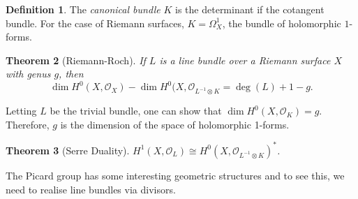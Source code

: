 \documentclass[10pt, a4paper]{article}
\theoremstyle{plain}
\newtheorem{thrm}{Theorem}[section]
\theoremstyle{definition}
\newtheorem{defn}[thrm]{Definition}
\begin{document}
\begin{defn} The \emph{canonical bundle} $K$ is the determinant if the cotangent bundle. For the case of Riemann surfaces, $K = \Omega^1_X$, the bundle of holomorphic $1$-forms. 
\end{defn} 
\begin{thrm}[Riemann-Roch]
If $L$ is a line bundle over a Riemann surface $X$ with genus $g$, then
$$\dim H^0(X, \mathcal{O}_X) - \dim H^0(X, \mathcal{O}_{L^{-1} \otimes K} = \deg(L)+1-g.$$
\end{thrm} 
Letting $L$ be the trivial bundle, one can show that $\dim H^0(X, \mathcal{O}_K) = g$. Therefore, $g$ is the dimension of the space of holomorphic 1-forms. 
\begin{thrm}[Serre Duality]
$H^1(X, \mathcal{O}_L) \cong H^0(X, \mathcal{O}_{L^{-1} \otimes K})^*$. 
\end{thrm} 
The Picard group has some interesting geometric structures and to see this, we need to realise line bundles via divisors. 
\end{document}
